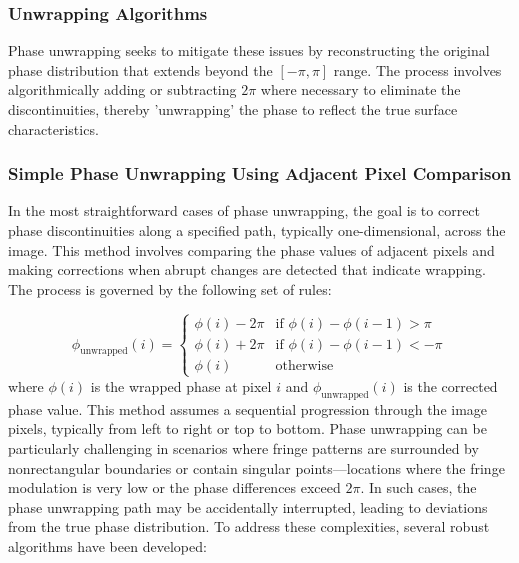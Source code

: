 \documentclass[../main.tex]{subfiles}
\begin{document}
\newpage
\begin{minipage}{\textwidth}
\subsubsection{Unwrapping Algorithms}
Phase unwrapping seeks to mitigate these issues by reconstructing the original phase distribution that extends beyond the $[-\pi, \pi]$ range. The process involves algorithmically adding or subtracting $2\pi$ where necessary to eliminate the discontinuities, thereby 'unwrapping' the phase to reflect the true surface characteristics.

\subsubsection{Simple Phase Unwrapping Using Adjacent Pixel Comparison}
In the most straightforward cases of phase unwrapping, the goal is to correct phase discontinuities along a specified path, typically one-dimensional, across the image. This method involves comparing the phase values of adjacent pixels and making corrections when abrupt changes are detected that indicate wrapping. The process is governed by the following set of rules:

\begin{equation}
    \phi_{\text{unwrapped}}(i) = 
    \begin{cases} 
    \phi(i) - 2\pi & \text{if } \phi(i) - \phi(i-1) > \pi \\
    \phi(i) + 2\pi & \text{if } \phi(i) - \phi(i-1) < -\pi \\
    \phi(i) & \text{otherwise}
    \end{cases}
\end{equation}
\vspace{0.1cm}\newline
where \( \phi(i) \) is the wrapped phase at pixel \( i \) and \( \phi_{\text{unwrapped}}(i) \) is the corrected phase value. This method assumes a sequential progression through the image pixels, typically from left to right or top to bottom.
\vspace{0.2cm}\newline
Phase unwrapping can be particularly challenging in scenarios where fringe patterns are surrounded by nonrectangular boundaries or contain singular points—locations where the fringe modulation is very low or the phase differences exceed \(2\pi\). In such cases, the phase unwrapping path may be accidentally interrupted, leading to deviations from the true phase distribution. To address these complexities, several robust algorithms have been developed:


\end{minipage}
\end{document}
